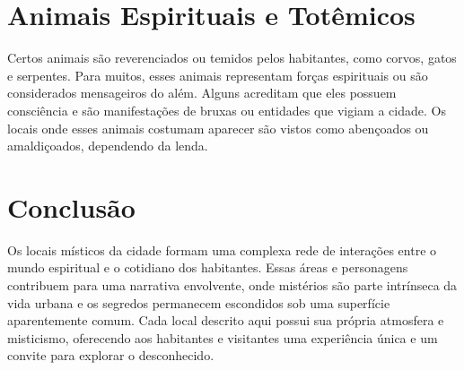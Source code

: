 \section{Animais Espirituais e Totêmicos}
Certos animais são reverenciados ou temidos pelos habitantes, como corvos, gatos e serpentes. Para muitos, esses animais representam forças espirituais ou são considerados mensageiros do além. Alguns acreditam que eles possuem consciência e são manifestações de bruxas ou entidades que vigiam a cidade. Os locais onde esses animais costumam aparecer são vistos como abençoados ou amaldiçoados, dependendo da lenda.

\section{Conclusão}
Os locais místicos da cidade formam uma complexa rede de interações entre o mundo espiritual e o cotidiano dos habitantes. Essas áreas e personagens contribuem para uma narrativa envolvente, onde mistérios são parte intrínseca da vida urbana e os segredos permanecem escondidos sob uma superfície aparentemente comum. Cada local descrito aqui possui sua própria atmosfera e misticismo, oferecendo aos habitantes e visitantes uma experiência única e um convite para explorar o desconhecido.


